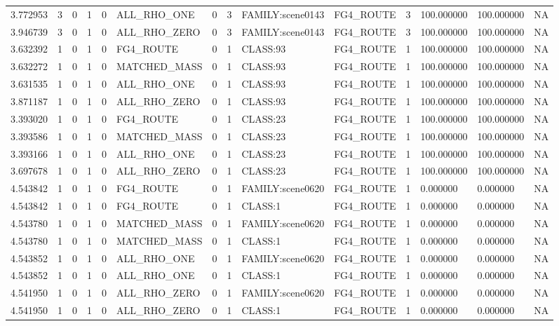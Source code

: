\begin{tabular}{llllllllllllll}
3.772953 & 3 & 0 & 1 & 0 & ALL\_RHO\_ONE & 0 & 3 & FAMILY:scene0143 & FG4\_ROUTE & 3 & 100.000000 & 100.000000 & NA \\
3.946739 & 3 & 0 & 1 & 0 & ALL\_RHO\_ZERO & 0 & 3 & FAMILY:scene0143 & FG4\_ROUTE & 3 & 100.000000 & 100.000000 & NA \\
3.632392 & 1 & 0 & 1 & 0 & FG4\_ROUTE & 0 & 1 & CLASS:93 & FG4\_ROUTE & 1 & 100.000000 & 100.000000 & NA \\
3.632272 & 1 & 0 & 1 & 0 & MATCHED\_MASS & 0 & 1 & CLASS:93 & FG4\_ROUTE & 1 & 100.000000 & 100.000000 & NA \\
3.631535 & 1 & 0 & 1 & 0 & ALL\_RHO\_ONE & 0 & 1 & CLASS:93 & FG4\_ROUTE & 1 & 100.000000 & 100.000000 & NA \\
3.871187 & 1 & 0 & 1 & 0 & ALL\_RHO\_ZERO & 0 & 1 & CLASS:93 & FG4\_ROUTE & 1 & 100.000000 & 100.000000 & NA \\
3.393020 & 1 & 0 & 1 & 0 & FG4\_ROUTE & 0 & 1 & CLASS:23 & FG4\_ROUTE & 1 & 100.000000 & 100.000000 & NA \\
3.393586 & 1 & 0 & 1 & 0 & MATCHED\_MASS & 0 & 1 & CLASS:23 & FG4\_ROUTE & 1 & 100.000000 & 100.000000 & NA \\
3.393166 & 1 & 0 & 1 & 0 & ALL\_RHO\_ONE & 0 & 1 & CLASS:23 & FG4\_ROUTE & 1 & 100.000000 & 100.000000 & NA \\
3.697678 & 1 & 0 & 1 & 0 & ALL\_RHO\_ZERO & 0 & 1 & CLASS:23 & FG4\_ROUTE & 1 & 100.000000 & 100.000000 & NA \\
4.543842 & 1 & 0 & 1 & 0 & FG4\_ROUTE & 0 & 1 & FAMILY:scene0620 & FG4\_ROUTE & 1 & 0.000000 & 0.000000 & NA \\
4.543842 & 1 & 0 & 1 & 0 & FG4\_ROUTE & 0 & 1 & CLASS:1 & FG4\_ROUTE & 1 & 0.000000 & 0.000000 & NA \\
4.543780 & 1 & 0 & 1 & 0 & MATCHED\_MASS & 0 & 1 & FAMILY:scene0620 & FG4\_ROUTE & 1 & 0.000000 & 0.000000 & NA \\
4.543780 & 1 & 0 & 1 & 0 & MATCHED\_MASS & 0 & 1 & CLASS:1 & FG4\_ROUTE & 1 & 0.000000 & 0.000000 & NA \\
4.543852 & 1 & 0 & 1 & 0 & ALL\_RHO\_ONE & 0 & 1 & FAMILY:scene0620 & FG4\_ROUTE & 1 & 0.000000 & 0.000000 & NA \\
4.543852 & 1 & 0 & 1 & 0 & ALL\_RHO\_ONE & 0 & 1 & CLASS:1 & FG4\_ROUTE & 1 & 0.000000 & 0.000000 & NA \\
4.541950 & 1 & 0 & 1 & 0 & ALL\_RHO\_ZERO & 0 & 1 & FAMILY:scene0620 & FG4\_ROUTE & 1 & 0.000000 & 0.000000 & NA \\
4.541950 & 1 & 0 & 1 & 0 & ALL\_RHO\_ZERO & 0 & 1 & CLASS:1 & FG4\_ROUTE & 1 & 0.000000 & 0.000000 & NA \\

\end{tabular}
